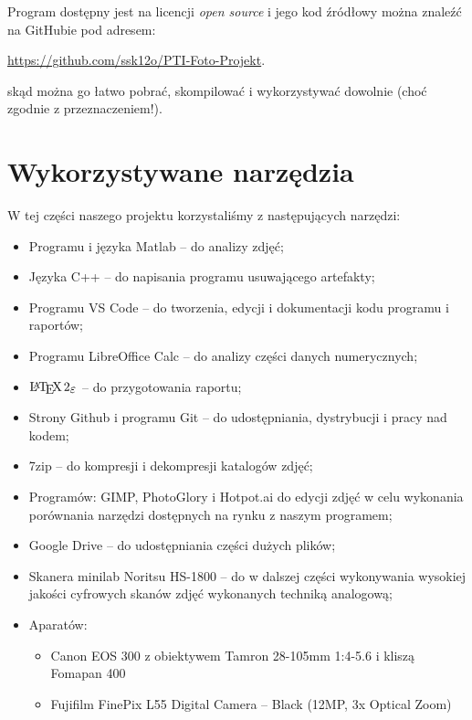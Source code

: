 \documentclass[]{mwart}
\begin{document}
Program dostępny jest na licencji \textit{open source} i jego kod źródłowy można znaleźć na GitHubie
pod adresem:
\begin{center}
    \url{https://github.com/ssk12o/PTI-Foto-Projekt}.
\end{center}
skąd można go łatwo pobrać, skompilować i wykorzystywać dowolnie (choć zgodnie z przeznaczeniem!).




\section{Wykorzystywane narzędzia}
W tej części naszego projektu korzystaliśmy z następujących narzędzi:

\begin{itemize}
    \item Programu i języka Matlab -- do analizy zdjęć;
    \item Języka C++ -- do napisania programu usuwającego artefakty;
    \item Programu VS Code -- do tworzenia, edycji i dokumentacji kodu programu i raportów;
    \item Programu LibreOffice Calc -- do analizy części danych numerycznych;
    \item $\LaTeXe{}$ -- do przygotowania raportu;
    \item Strony Github i programu Git -- do udostępniania, dystrybucji i pracy nad kodem;
    \item 7zip -- do kompresji i dekompresji katalogów zdjęć;
    \item Programów: GIMP, PhotoGlory i Hotpot.ai do edycji zdjęć w celu wykonania porównania narzędzi dostępnych na rynku z naszym programem;
    \item Google Drive -- do udostępniania części dużych plików;
    \item Skanera minilab Noritsu HS-1800 -- do w dalszej części wykonywania wysokiej jakości cyfrowych skanów zdjęć wykonanych techniką analogową;
    \item Aparatów:
          \begin{itemize}
              \item Canon EOS 300 z obiektywem Tamron 28-105mm 1:4-5.6 i kliszą Fomapan 400
              \item Fujifilm FinePix L55 Digital Camera -- Black (12MP, 3x Optical Zoom)
          \end{itemize}
\end{itemize}
\end{document}

